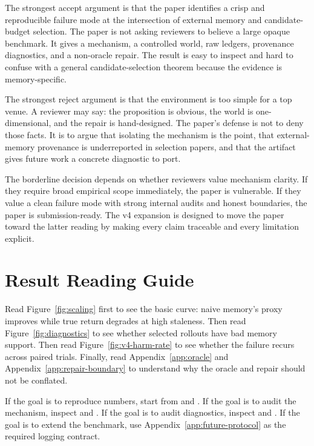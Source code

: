 \documentclass{article}
\begin{document}
The strongest accept argument is that the paper identifies a crisp and
reproducible failure mode at the intersection of external memory and
candidate-budget selection. The paper is not asking reviewers to believe a
large opaque benchmark. It gives a mechanism, a controlled world, raw ledgers,
provenance diagnostics, and a non-oracle repair. The result is easy to inspect
and hard to confuse with a general candidate-selection theorem because the
evidence is memory-specific.

The strongest reject argument is that the environment is too simple for a top
venue. A reviewer may say: the proposition is obvious, the world is
one-dimensional, and the repair is hand-designed. The paper's defense is not
to deny those facts. It is to argue that isolating the mechanism is the point,
that external-memory provenance is underreported in selection papers, and that
the artifact gives future work a concrete diagnostic to port.

The borderline decision depends on whether reviewers value mechanism clarity.
If they require broad empirical scope immediately, the paper is vulnerable. If
they value a clean failure mode with strong internal audits and honest
boundaries, the paper is submission-ready. The v4 expansion is designed to
move the paper toward the latter reading by making every claim traceable and
every limitation explicit.

\section{Result Reading Guide}
\label{app:reading-guide}

Read Figure~\ref{fig:scaling} first to see the basic curve: naive memory's
proxy improves while true return degrades at high staleness. Then read
Figure~\ref{fig:diagnostics} to see whether selected rollouts have bad memory
support. Then read Figure~\ref{fig:v4-harm-rate} to see whether the failure
recurs across paired trials. Finally, read Appendix~\ref{app:oracle} and
Appendix~\ref{app:repair-boundary} to understand why the oracle and repair
should not be conflated.

If the goal is to reproduce numbers, start from  and
. If the goal is to audit the mechanism, inspect
 and . If the goal is to audit
diagnostics, inspect  and
. If the goal is to extend the benchmark, use
Appendix~\ref{app:future-protocol} as the required logging contract.
\end{document}
